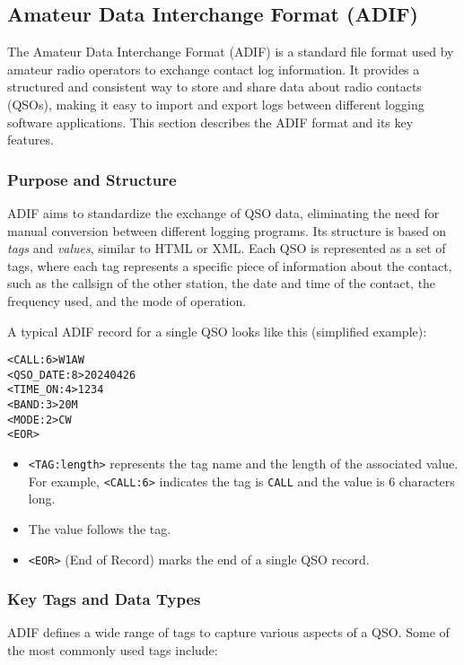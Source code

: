 \subsection{Amateur Data Interchange Format (ADIF)}

The Amateur Data Interchange Format (ADIF) is a standard file format used by amateur radio operators to exchange contact log information. It provides a structured and consistent way to store and share data about radio contacts (QSOs), making it easy to import and export logs between different logging software applications. This section describes the ADIF format and its key features.

\subsubsection{Purpose and Structure}

ADIF aims to standardize the exchange of QSO data, eliminating the need for manual conversion between different logging programs. Its structure is based on \textit{tags} and \textit{values}, similar to HTML or XML. Each QSO is represented as a set of tags, where each tag represents a specific piece of information about the contact, such as the callsign of the other station, the date and time of the contact, the frequency used, and the mode of operation.

A typical ADIF record for a single QSO looks like this (simplified example):

\begin{verbatim}
<CALL:6>W1AW
<QSO_DATE:8>20240426
<TIME_ON:4>1234
<BAND:3>20M
<MODE:2>CW
<EOR>
\end{verbatim}

\begin{itemize}
    \item \texttt{<TAG:length>} represents the tag name and the length of the associated value. For example, \texttt{<CALL:6>} indicates the tag is \texttt{CALL} and the value is 6 characters long.
    \item The value follows the tag.
    \item \texttt{<EOR>} (End of Record) marks the end of a single QSO record.
\end{itemize}

\subsubsection{Key Tags and Data Types}

ADIF defines a wide range of tags to capture various aspects of a QSO. Some of the most commonly used tags include:

